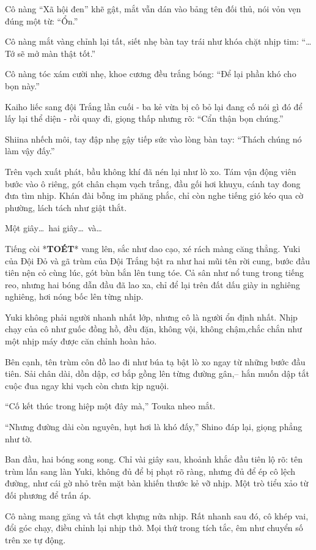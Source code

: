 \documentclass[../main.tex]{subfiles}
\begin{document}
Cô nàng ``Xã hội đen'' khẽ gật, mắt vẫn dán vào bảng tên đối thủ, nói vỏn vẹn đúng một từ: ``Ổn.''

Cô nàng mắt vàng chỉnh lại tất, siết nhẹ bàn tay trái như khóa chặt nhịp tim: ``\dots Tớ sẽ mở màn thật tốt.''

Cô nàng tóc xám cười nhẹ, khoe cương đều trắng bóng: ``Để lại phần khó cho bọn này.''

Kaiho liếc sang đội Trắng lần cuối - ba kẻ vừa bị cô bỏ lại đang cố nói gì đó để lấy lại thể diện - rồi quay đi, giọng thấp nhưng rõ: ``Cẩn thận bọn chúng.''

Shiina nhếch môi, tay đập nhẹ gậy tiếp sức vào lòng bàn tay: ``Thách chúng nó làm vậy đấy.''

Trên vạch xuất phát, bầu không khí đã nén lại như lò xo. Tám vận động viên bước vào ô riêng, gót chân chạm vạch trắng, đầu gối hơi khuỵu, cánh tay đong đưa tìm nhịp. Khán đài bỗng im phăng phắc, chỉ còn nghe tiếng gió kéo qua cờ phường, lách tách như giật thắt.

Một giây\dots\ hai giây\dots\ và\dots

Tiếng còi *\textbf{TOÉT}* vang lên, sắc như dao cạo, xé rách màng căng thẳng. Yuki của Đội Đỏ và gã trùm của Đội Trắng bật ra như hai mũi tên rời cung, bước đầu tiên nện cỏ cùng lúc, gót bùn bắn lên tung tóe. Cả sân như nổ tung trong tiếng reo, nhưng hai bóng dẫn đầu đã lao xa, chỉ để lại trên đất dấu giày in nghiêng nghiêng, hơi nóng bốc lên từng nhịp.

Yuki không phải người nhanh nhất lớp, nhưng cô là người ổn định nhất. Nhịp chạy của cô như guốc đồng hồ, đều đặn, không vội, không chậm,chắc chắn như một nhịp máy được căn chỉnh hoàn hảo.

Bên cạnh, tên trùm côn đồ lao đi như búa tạ bật lò xo ngay từ những bước đầu tiên. Sải chân dài, dồn dập, cơ bắp gồng lên từng đường gân,– hắn muốn dập tắt cuộc đua ngay khi vạch còn chưa kịp nguội.

``Cố kết thúc trong hiệp một đây mà,'' Touka nheo mắt.

``Nhưng đường dài còn nguyên, hụt hơi là khó đấy,'' Shino đáp lại, giọng phẳng như tờ.

Ban đầu, hai bóng song song. Chỉ vài giây sau, khoảnh khắc đầu tiên lộ rõ: tên trùm lấn sang làn Yuki, không đủ để bị phạt rõ ràng, nhưng đủ để ép cô lệch đường, như cái gờ nhỏ trên mặt bàn khiến thước kẻ vỡ nhịp. Một trò tiểu xảo từ đối phương để trấn áp.

Cô nàng mang găng và tất chợt khựng nửa nhịp. Rất nhanh sau đó, cô khép vai, đổi góc chạy, điều chỉnh lại nhịp thở. Mọi thứ trong tích tắc, êm như chuyển số trên xe tự động.
\end{document}
